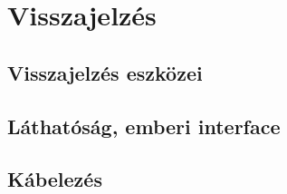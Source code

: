 \chapter{Visszajelzés}
\label{sec:Visszajelzes}

\section{Visszajelzés eszközei}

\section{Láthatóság, emberi interface}

\section{Kábelezés}
